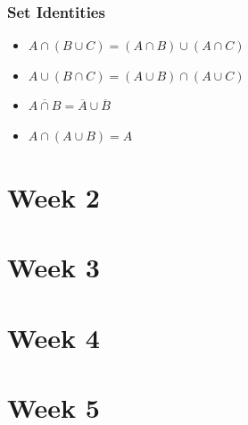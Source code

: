 \documentclass[12pt]{article}
\newcommand{\compline}[1]{\overline{#1}}
\theoremstyle{definition}
\begin{document}
            \subsubsection{Set Identities}
            \begin{itemize}
                \item $A \cap (B \cup C) = (A \cap B) \cup (A \cap C)$
                \item $A \cup (B \cap C) = (A \cup B) \cap (A \cup C)$
                \item $\compline{A \cap B} = \compline{A} \cup \compline{B}$
                \item $A \cap (A \cup B) = A$
            \end{itemize}

    \newpage
    \section{Week 2}

    \newpage
    \section{Week 3}

    \newpage
    \section{Week 4}

    \newpage
    \section{Week 5}
    
\end{document}
